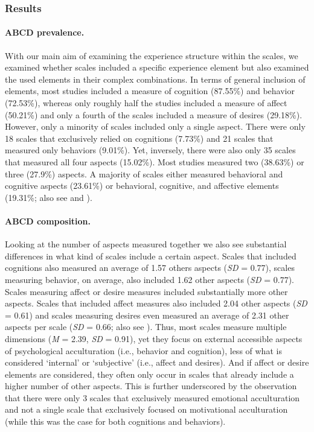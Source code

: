 \subsubsection{Results}

\paragraph{ABCD prevalence.}

With our main aim of examining the experience structure within the
scales, we examined whether scales included a specific experience
element but also examined the used elements in their complex
combinations. In terms of general inclusion of elements, most studies
included a measure of cognition (87.55\%) and behavior (72.53\%),
whereas only roughly half the studies included a measure of affect
(50.21\%) and only a fourth of the scales included a measure of desires
(29.18\%). However, only a minority of scales included only a single
aspect. There were only 18 scales that exclusively relied on cognitions
(7.73\%) and 21 scales that measured only behaviors (9.01\%). Yet,
inversely, there were also only 35 scales that measured all four aspects
(15.02\%). Most studies measured two (38.63\%) or three (27.9\%)
aspects. A majority of scales either measured behavioral and cognitive
aspects (23.61\%) or behavioral, cognitive, and affective elements
(19.31\%; also see  and
).

\paragraph{ABCD composition.}

Looking at the number of aspects measured together we also see
substantial differences in what kind of scales include a certain aspect.
Scales that included cognitions also measured an average of 1.57 others
aspects (\textit{SD} = 0.77), scales measuring behavior, on average,
also included 1.62 other aspects (\textit{SD} = 0.77). Scales measuring
affect or desire measures included substantially more other aspects.
Scales that included affect measures also included 2.04 other aspects
(\textit{SD} = 0.61) and scales measuring desires even measured an
average of 2.31 other aspects per scale (\textit{SD} = 0.66; also see
). Thus, most scales measure multiple
dimensions (\textit{M} = 2.39, \textit{SD} = 0.91), yet they focus on
external accessible aspects of psychological acculturation (i.e.,
behavior and cognition), less of what is considered `internal' or
`subjective' (i.e., affect and desires). And if affect or desire
elements are considered, they often only occur in scales that already
include a higher number of other aspects. This is further underscored by
the observation that there were only 3 scales that exclusively measured
emotional acculturation and not a single scale that exclusively focused
on motivational acculturation (while this was the case for both
cognitions and behaviors).

